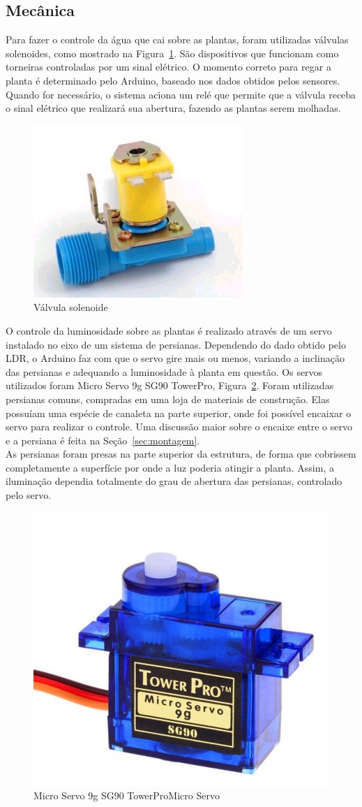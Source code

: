 \documentclass[a4paper,12pt]{report}
\begin{document}
			
		
		\subsection{Mecânica}
			Para fazer o controle da água que cai sobre as plantas, foram utilizadas válvulas solenoides, como mostrado na Figura~\ref{fig:VALVULA}. São dispositivos que funcionam como torneiras controladas por um sinal elétrico. O momento correto para regar a planta é determinado pelo Arduino, baseado nos dados obtidos pelos sensores. Quando for necessário, o sistema aciona um relé que permite que a válvula receba o sinal elétrico que realizará sua abertura, fazendo as plantas serem molhadas.	
			
			\begin{figure}[!h]
				\centering
				\includegraphics[width=0.4\linewidth]{figs/valvula}
				\caption{Válvula solenoide}
				\label{fig:VALVULA}
			\end{figure}
		
			O controle da luminosidade sobre as plantas é realizado através de um servo instalado no eixo de um sistema de persianas. Dependendo do dado obtido pelo LDR, o Arduino faz com que o servo gire mais ou menos, variando a inclinação das persianas e adequando a luminosidade à planta em questão. Os servos utilizados foram Micro Servo 9g SG90 TowerPro, Figura~\ref{fig:SERVO}. Foram utilizadas persianas comuns, compradas em uma loja de materiais de construção. Elas possuíam uma espécie de canaleta na parte superior, onde foi possível encaixar o servo para realizar o controle. Uma discussão maior sobre o encaixe entre o servo e a persiana é feita na Seção~\ref{sec:montagem}. \\
			As persianas foram presas na parte superior da estrutura, de forma que cobrissem completamente a superfície por onde a luz poderia atingir a planta. Assim, a iluminação dependia totalmente do grau de abertura das persianas, controlado pelo servo. 
			
				
			\begin{figure}[!h]
				\centering
				\includegraphics[width=0.4\linewidth]{figs/servo}
				\caption{Micro Servo 9g SG90 TowerProMicro Servo}
				\label{fig:SERVO}
			\end{figure}
		
\end{document}
